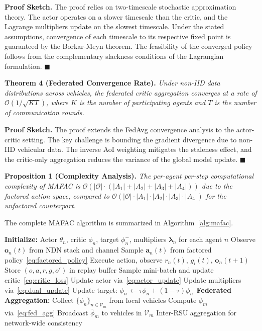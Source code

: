 \documentclass[journal]{IEEEtran}
\begin{document}
\textbf{Proof Sketch.} The proof relies on two-timescale stochastic approximation theory. The actor operates on a slower timescale than the critic, and the Lagrange multipliers update on the slowest timescale. Under the stated assumptions, convergence of each timescale to its respective fixed point is guaranteed by the Borkar-Meyn theorem. The feasibility of the converged policy follows from the complementary slackness conditions of the Lagrangian formulation. \hfill $\blacksquare$

\textbf{Theorem 4 (Federated Convergence Rate).} \emph{Under non-IID data distributions across vehicles, the federated critic aggregation converges at a rate of $\mathcal{O}(1/\sqrt{KT})$, where $K$ is the number of participating agents and $T$ is the number of communication rounds.}

\textbf{Proof Sketch.} The proof extends the FedAvg convergence analysis to the actor-critic setting. The key challenge is bounding the gradient divergence due to non-IID vehicular data. The inverse AoI weighting mitigates the staleness effect, and the critic-only aggregation reduces the variance of the global model update. \hfill $\blacksquare$

\textbf{Proposition 1 (Complexity Analysis).} \emph{The per-agent per-step computational complexity of MAFAC is $\mathcal{O}(|\mathcal{O}| \cdot (|A_1| + |A_2| + |A_3| + |A_4|))$ due to the factored action space, compared to $\mathcal{O}(|\mathcal{O}| \cdot |A_1| \cdot |A_2| \cdot |A_3| \cdot |A_4|)$ for the unfactored counterpart.}

The complete MAFAC algorithm is summarized in Algorithm~\ref{alg:mafac}.

\begin{algorithm}[!t]
\caption{MAFAC: Multi-Agent Federated Actor-Critic}
\label{alg:mafac}
\begin{algorithmic}[1]
\State \textbf{Initialize:} Actor $\theta_n$, critic $\phi_n$, target $\phi_n^-$, multipliers $\boldsymbol{\lambda}_n$ for each agent $n$
            \State Observe $\mathbf{o}_n(t)$ from NDN stack and channel
            \State Sample $\mathbf{a}_n(t)$ from factored policy~\eqref{eq:factored_policy}
            \State Execute action, observe $r_n(t)$, $g_i(t)$, $\mathbf{o}_n(t+1)$
            \State Store $(o, a, r, g, o')$ in replay buffer
            \State Sample mini-batch and update critic~\eqref{eq:critic_loss}
            \State Update actor via~\eqref{eq:actor_update}
            \State Update multipliers via~\eqref{eq:dual_update}
            \State Update target: $\phi_n^- \leftarrow \tau \phi_n + (1-\tau)\phi_n^-$
        \EndFor
    \EndFor
    \State \textbf{Federated Aggregation:}
        \State Collect $\{\phi_n\}_{n \in \mathcal{V}_m}$ from local vehicles
        \State Compute $\bar{\phi}_m$ via~\eqref{eq:fed_agg}
        \State Broadcast $\bar{\phi}_m$ to vehicles in $\mathcal{V}_m$
    \EndFor
    \State Inter-RSU aggregation for network-wide consistency
\EndFor
\end{algorithmic}
\end{algorithm}
\end{document}
